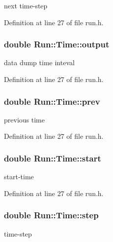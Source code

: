 next time-step 



Definition at line 27 of file run.h.\hypertarget{structRun_1_1Time_f8cf74f66df79569a1b50da8b8fbe45f}{
\subsubsection[{output}]{\setlength{\rightskip}{0pt plus 5cm}double {\bf Run::Time::output}}}
\label{structRun_1_1Time_f8cf74f66df79569a1b50da8b8fbe45f}


data dump time inteval 



Definition at line 27 of file run.h.\hypertarget{structRun_1_1Time_fa811a22c98d81c237a8079ac1e895c3}{
\subsubsection[{prev}]{\setlength{\rightskip}{0pt plus 5cm}double {\bf Run::Time::prev}}}
\label{structRun_1_1Time_fa811a22c98d81c237a8079ac1e895c3}


previous time 



Definition at line 27 of file run.h.\hypertarget{structRun_1_1Time_0e7fe62ba04bf096677fb4cbb3f01d69}{
\subsubsection[{start}]{\setlength{\rightskip}{0pt plus 5cm}double {\bf Run::Time::start}}}
\label{structRun_1_1Time_0e7fe62ba04bf096677fb4cbb3f01d69}


start-time 



Definition at line 27 of file run.h.\hypertarget{structRun_1_1Time_5459d9ad262952019c1d4e45acba4b77}{
\subsubsection[{step}]{\setlength{\rightskip}{0pt plus 5cm}double {\bf Run::Time::step}}}
\label{structRun_1_1Time_5459d9ad262952019c1d4e45acba4b77}


time-step 



